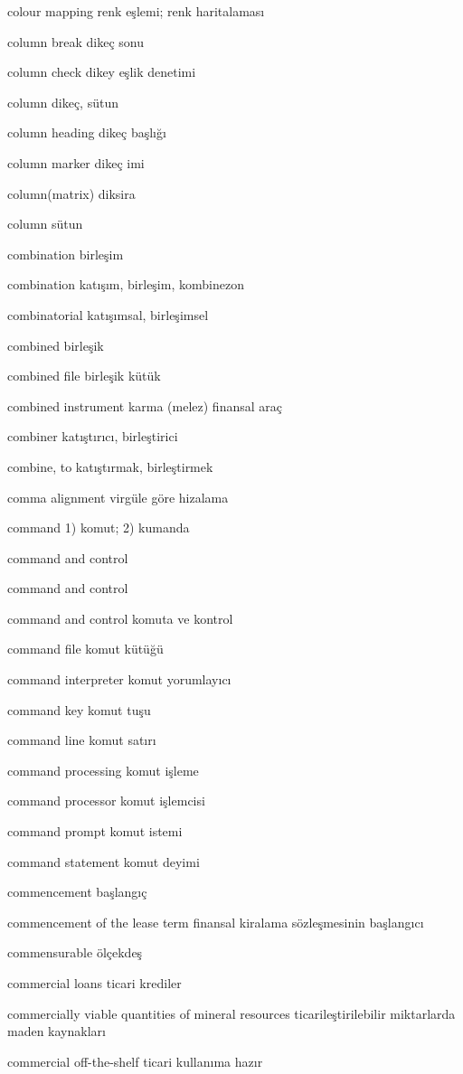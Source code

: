 \documentclass[12pt,fleqn]{article}\usepackage{../../common}
\begin{document}
colour mapping renk eşlemi; renk haritalaması

column break dikeç sonu

column check dikey eşlik denetimi

column dikeç, sütun

column heading dikeç başlığı

column marker dikeç imi

column(matrix) diksira

column sütun

combination birleşim

combination katışım, birleşim, kombinezon

combinatorial katışımsal, birleşimsel

combined birleşik

combined file birleşik kütük

combined instrument karma (melez) finansal araç

combiner katıştırıcı, birleştirici

combine, to katıştırmak, birleştirmek

comma alignment virgüle göre hizalama

command 1) komut; 2) kumanda

command and control

command and control

command and control komuta ve kontrol

command file komut kütüğü

command interpreter komut yorumlayıcı

command key komut tuşu

command line komut satırı

command processing komut işleme

command processor komut işlemcisi

command prompt komut istemi

command statement komut deyimi

commencement başlangıç

commencement of the lease term finansal kiralama sözleşmesinin başlangıcı

commensurable ölçekdeş

commercial loans ticari krediler

commercially viable quantities of mineral resources ticarileştirilebilir miktarlarda maden kaynakları

commercial off-the-shelf ticari kullanıma hazır
\end{document}
